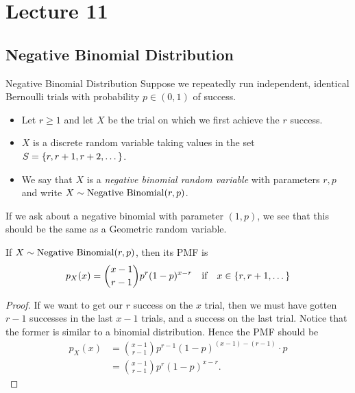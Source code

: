 \documentclass[class=article, crop=false]{standalone}
\begin{document}
  \section{Lecture 11}
  \subsection{Negative Binomial Distribution}
  \begin{definition}{Negative Binomial Distribution}
    Suppose we repeatedly run independent, identical Bernoulli trials with probability $p\in (0, 1)$ of success.
    \begin{itemize}
      \item Let $r \geq 1$ and let $X$ be the trial on which we first achieve the $r$ success.
      \item $X$ is a discrete random variable taking values in the set $S = \left\{r, r + 1, r + 2, \dotsc\right\}$.
      \item We say that $X$ is a \emph{negative binomial random variable} with parameters $r, p$ and write $X\sim \operatorname{Negative\ Binomial}(r, p)$.
    \end{itemize}
  \end{definition}
  \begin{note}{}
    If we ask about a negative binomial with parameter $(1, p)$, we see that this should be the same as a Geometric random variable.
  \end{note}
  \begin{theorem}{}
    If $X\sim \operatorname{Negative\ Binomial}(r, p)$, then its PMF is
    \[
      p_X(x) = \binom{x - 1}{r - 1}p^r(1 - p)^{x - r}\quad\text{if}\quad x\in \left\{r, r + 1, \dotsc\right\}
    \]
    \begin{proof}
      If we want to get our $r$ success on the $x$ trial, then we must have gotten $r - 1$ successes in the last $x - 1$ trials, and a success on the last trial. Notice that the former is similar to a binomial distribution. Hence the PMF should be
      \begin{align*}
        p_X(x) &= \binom{x - 1}{r - 1}p^{r - 1}(1 - p)^{(x - 1) - (r - 1)}\cdot p \\
               &= \binom{x - 1}{r - 1}p^r(1 - p)^{x - r}.
      \end{align*}
    \end{proof}
  \end{theorem}
\end{document}
